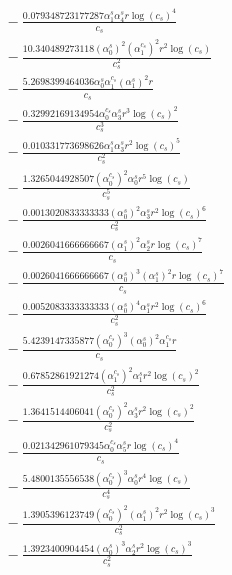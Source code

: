 \documentclass[10pt]{article}
\begin{document}
\begin{align*}
&{}  - \frac{0.079348723177287 \alpha_{1}^s \alpha_{4}^s r \log{\left(c_{s} \right)}^{4}}{c_{s}} \\
&{}  - \frac{10.340489273118 \left(\alpha_{0}^s\right)^{2} \left(\alpha_{1}^{c_s}\right)^{2} r^{2} \log{\left(c_{s} \right)}}{c_{s}^{2}} \\
&{}  - \frac{5.2698399464036 \alpha_{0}^s \alpha_{1}^{c_s} \left(\alpha_{1}^s\right)^{2} r}{c_{s}} \\
&{}  - \frac{0.32992169134954 \alpha_{0}^{c_s} \alpha_{3}^s r^{3} \log{\left(c_{s} \right)}^{2}}{c_{s}^{3}} \\
&{}  - \frac{0.010331773698626 \alpha_{1}^s \alpha_{3}^s r^{2} \log{\left(c_{s} \right)}^{5}}{c_{s}^{2}} \\
&{}  - \frac{1.3265044928507 \left(\alpha_{0}^{c_s}\right)^{2} \alpha_{0}^s r^{5} \log{\left(c_{s} \right)}}{c_{s}^{5}} \\
&{}  - \frac{0.0013020833333333 \left(\alpha_{0}^s\right)^{2} \alpha_{3}^s r^{2} \log{\left(c_{s} \right)}^{6}}{c_{s}^{2}} \\
&{}  - \frac{0.0026041666666667 \left(\alpha_{1}^s\right)^{2} \alpha_{2}^s r \log{\left(c_{s} \right)}^{7}}{c_{s}} \\
&{}  - \frac{0.0026041666666667 \left(\alpha_{0}^s\right)^{3} \left(\alpha_{1}^s\right)^{2} r \log{\left(c_{s} \right)}^{7}}{c_{s}} \\
&{}  - \frac{0.0052083333333333 \left(\alpha_{0}^s\right)^{4} \alpha_{1}^s r^{2} \log{\left(c_{s} \right)}^{6}}{c_{s}^{2}} \\
&{}  - \frac{5.4239147335877 \left(\alpha_{0}^{c_s}\right)^{3} \left(\alpha_{0}^s\right)^{2} \alpha_{1}^{c_s} r}{c_{s}} \\
&{}  - \frac{0.67852861921274 \left(\alpha_{1}^{c_s}\right)^{2} \alpha_{1}^s r^{2} \log{\left(c_{s} \right)}^{2}}{c_{s}^{2}} \\
&{}  - \frac{1.3641514406041 \left(\alpha_{0}^{c_s}\right)^{2} \alpha_{3}^s r^{2} \log{\left(c_{s} \right)}^{2}}{c_{s}^{2}} \\
&{}  - \frac{0.021342961079345 \alpha_{0}^{c_s} \alpha_{5}^s r \log{\left(c_{s} \right)}^{4}}{c_{s}} \\
&{}  - \frac{5.4800135556538 \left(\alpha_{0}^{c_s}\right)^{3} \alpha_{0}^s r^{4} \log{\left(c_{s} \right)}}{c_{s}^{4}} \\
&{}  - \frac{1.3905396123749 \left(\alpha_{0}^{c_s}\right)^{2} \left(\alpha_{1}^s\right)^{2} r^{2} \log{\left(c_{s} \right)}^{3}}{c_{s}^{2}} \\
&{}  - \frac{1.3923400904454 \left(\alpha_{0}^s\right)^{3} \alpha_{2}^s r^{2} \log{\left(c_{s} \right)}^{3}}{c_{s}^{2}} \\

\end{align*}
\end{document}
